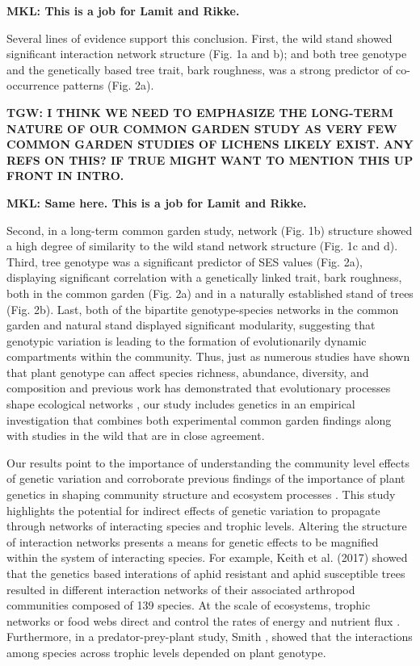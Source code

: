 \documentclass[9pt,twocolumn,twoside,lineno]{pnas-new}
\begin{document}
\textbf{MKL: This is a job for Lamit and Rikke.}

Several lines of evidence support this conclusion. First, the wild
stand showed significant interaction network structure (Fig. 1a and
b); and both tree genotype and the genetically based tree trait, bark
roughness, was a strong predictor of co-occurrence patterns
(Fig. 2a). 

\textbf{TGW: I THINK WE NEED TO EMPHASIZE THE LONG-TERM NATURE OF OUR
COMMON GARDEN STUDY AS VERY FEW COMMON GARDEN STUDIES OF LICHENS
LIKELY EXIST. ANY REFS ON THIS? IF TRUE MIGHT WANT TO MENTION THIS UP
FRONT IN INTRO.}

\textbf{MKL: Same here. This is a job for Lamit and Rikke.}

Second, in a long-term common garden study, network
(Fig. 1b) structure showed a high degree of similarity to the wild
stand network structure (Fig. 1c and d). Third, tree genotype was a
significant predictor of SES values (Fig. 2a), displaying significant
correlation with a genetically linked trait, bark roughness, both in
the common garden (Fig. 2a) and in a naturally established stand of
trees (Fig. 2b). Last, both of the bipartite genotype-species networks
in the common garden and natural stand displayed significant
modularity, suggesting that genotypic variation is leading to the
formation of evolutionarily dynamic compartments within the
community. Thus, just as numerous studies have shown that plant
genotype can affect species richness, abundance, diversity, and
composition and previous work has demonstrated that evolutionary
processes shape ecological networks \cite{Guimaraes2011,
  Moya-Larano2011}, our study includes genetics in an empirical
investigation that combines both experimental common garden findings
along with studies in the wild that are in close agreement.

Our results point to the importance of understanding the community
level effects of genetic variation and corroborate previous findings
of the importance of plant genetics in shaping community structure and
ecosystem processes \cite{Whitham2006a}.  This study highlights the
potential for indirect effects of genetic variation to propagate
through networks of interacting species and trophic levels. Altering
the structure of interaction networks presents a means for genetic
effects to be magnified within the system of interacting species. For
example, Keith et al. (2017) showed that the genetics based
interations of aphid resistant and aphid susceptible trees resulted in
different interaction networks of their associated arthropod
communities composed of 139 species. At the scale of ecosystems,
trophic networks or food webs direct and control the rates of energy
and nutrient flux \cite{Borgatti2006}. Furthermore, in a
predator-prey-plant study, Smith \cite{Smith2011}, showed that the
interactions among species across trophic levels depended on plant
genotype.
\end{document}
